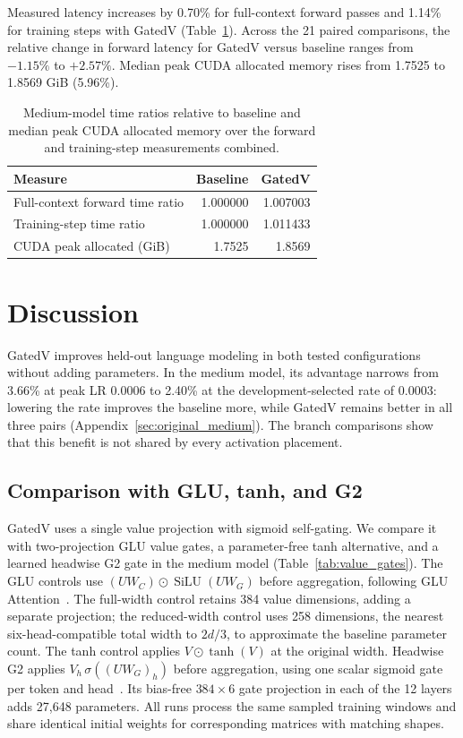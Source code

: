 \documentclass[11pt,a4paper]{article}
\newcommand{\silu}{\operatorname{SiLU}}
\begin{document}
Measured latency increases by 0.70\% for full-context forward passes and 1.14\% for training steps with GatedV (Table~\ref{tab:cost}). Across the 21 paired comparisons, the relative change in forward latency for GatedV versus baseline ranges from $-1.15\%$ to $+2.57\%$. Median peak CUDA allocated memory rises from 1.7525 to 1.8569 GiB (5.96\%).

\begin{table}[t]
\centering\small
\caption{Medium-model time ratios relative to baseline and median peak CUDA allocated memory over the forward and training-step measurements combined.}
\label{tab:cost}
\begin{tabular}{lrr}
\toprule
Measure & Baseline & GatedV\\
\midrule
Full-context forward time ratio & 1.000000 & 1.007003\\
Training-step time ratio & 1.000000 & 1.011433\\
CUDA peak allocated (GiB) & 1.7525 & 1.8569\\
\bottomrule
\end{tabular}
\end{table}

\section{Discussion}
\label{sec:analysis}
\label{sec:discussion}
GatedV improves held-out language modeling in both tested configurations without adding parameters. In the medium model, its advantage narrows from 3.66\% at peak LR 0.0006 to 2.40\% at the development-selected rate of 0.0003: lowering the rate improves the baseline more, while GatedV remains better in all three pairs (Appendix~\ref{sec:original_medium}). The branch comparisons show that this benefit is not shared by every activation placement.

\subsection{Comparison with GLU, tanh, and G2}
\label{sec:gate_comparison}
GatedV uses a single value projection with sigmoid self-gating. We compare it with two-projection GLU value gates, a parameter-free tanh alternative, and a learned headwise G2 gate in the medium model (Table~\ref{tab:value_gates}). The GLU controls use $(UW_C)\odot\silu(UW_G)$ before aggregation, following GLU Attention~\citep{gluattention}. The full-width control retains 384 value dimensions, adding a separate projection; the reduced-width control uses 258 dimensions, the nearest six-head-compatible total width to $2d/3$, to approximate the baseline parameter count. The tanh control applies $V\odot\tanh(V)$ at the original width. Headwise G2 applies $V_h\,\sigma((UW_G)_h)$ before aggregation, using one scalar sigmoid gate per token and head~\citep{gatedattention}. Its bias-free $384\times6$ gate projection in each of the 12 layers adds 27,648 parameters. All runs process the same sampled training windows and share identical initial weights for corresponding matrices with matching shapes.
\end{document}
